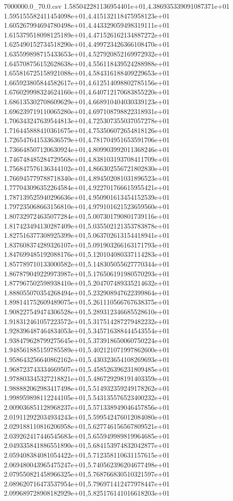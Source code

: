 \begin{filecontents*}{7000000.0_70.0.csv}
1.585042281136954401e+01,4.386935339091087371e+01
1.595155582411454098e+01,4.415132118475958123e+01
1.605267994694780498e+01,4.443329059498319111e+01
1.615379518098125189e+01,4.471526162134887272e+01
1.625490152734518290e+01,4.499723426366108470e+01
1.635599898715433653e+01,4.527920852169972932e+01
1.645708756152628638e+01,4.556118439524288988e+01
1.655816725158921088e+01,4.584316188409229653e+01
1.665923805844582617e+01,4.612514098802785156e+01
1.676029998324624160e+01,4.640712170683855220e+01
1.686135302708609629e+01,4.668910404030339123e+01
1.696239719110065280e+01,4.697108798822318931e+01
1.706343247639544813e+01,4.725307355037057278e+01
1.716445888410361675e+01,4.753506072654818126e+01
1.726547641533636579e+01,4.781704951653591706e+01
1.736648507120630924e+01,4.809903992011368246e+01
1.746748485284729568e+01,4.838103193708411709e+01
1.756847576136344102e+01,4.866302556721802830e+01
1.766945779788718340e+01,4.894502081031896523e+01
1.777043096352264584e+01,4.922701766615955421e+01
1.787139525940296636e+01,4.950901613454152539e+01
1.797235068663156810e+01,4.979101621523659560e+01
1.807329724635077284e+01,5.007301790801739116e+01
1.817423494130287409e+01,5.035502121353783878e+01
1.827516377308925399e+01,5.063702613154418941e+01
1.837608374289326107e+01,5.091903266163171793e+01
1.847699485192088176e+01,5.120104080337114283e+01
1.857789710133000582e+01,5.148305055627770344e+01
1.867879049229973987e+01,5.176506191980570293e+01
1.877967502598938410e+01,5.204707489335214632e+01
1.888055070354268494e+01,5.232908947622399864e+01
1.898141752609489075e+01,5.261110566767638375e+01
1.908227549474306528e+01,5.289312346685528610e+01
1.918312461057223572e+01,5.317514287279482232e+01
1.928396487464834053e+01,5.345716388444543554e+01
1.938479628799275645e+01,5.373918650060750224e+01
1.948561885159785589e+01,5.402121071997862600e+01
1.958643256640862162e+01,5.430323654108269693e+01
1.968723743334669507e+01,5.458526396231809485e+01
1.978803345327218821e+01,5.486729298191403359e+01
1.988882062983417498e+01,5.514932359249178262e+01
1.998959898112244105e+01,5.543135576523400232e+01
2.009036851128968237e+01,5.571338949046457856e+01
2.019112922034934243e+01,5.599542476012084080e+01
2.029188110816206958e+01,5.627746156567809521e+01
2.039262417446545683e+01,5.655949989819964685e+01
2.049335841886551890e+01,5.684153974832042877e+01
2.059408384081054422e+01,5.712358110631157615e+01
2.069480043965475247e+01,5.740562396204677498e+01
2.079550821458966325e+01,5.768766830510321597e+01
2.089620716473537954e+01,5.796971412477978447e+01
2.099689728908182929e+01,5.825176141016618203e+01

\end{filecontents*}
